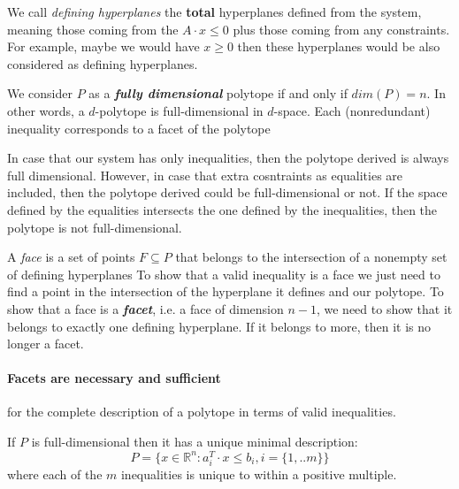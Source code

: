    We call \textit{defining hyperplanes} the \textbf{total}
   hyperplanes defined from the system, meaning 
   those coming from the $A \cdot x \leq 0$ 
   plus those coming from any constraints. 
   For example, maybe we would have $x \geq 0$ then these hyperplanes would be also considered
   as defining hyperplanes.

   We consider $P$ as a \textit{\textbf{fully dimensional}} polytope
   if and only if $dim(P) = n$.
   In other words, 
   a $d$-polytope is full-dimensional in $d$-space.
   Each (nonredundant) inequality corresponds to a facet of the polytope

   In case that our system has only inequalities, 
   then the polytope derived is always full dimensional.
   However, in case that extra cosntraints as equalities
   are included, then the polytope derived could be 
   full-dimensional or not. 
   If the space defined by the equalities intersects the one 
   defined by the inequalities, then the polytope is not full-dimensional.

   
   A \textit{face} is a set of points $ F \subseteq P$ that belongs 
   to the intersection of a nonempty set of defining hyperplanes 
   To show that a valid inequality is a face we just need to 
   find a point in the intersection of the hyperplane it defines
   and our polytope. 
   To show that a face is a \textit{\textbf{facet}}, 
   i.e. a face of dimension $n -1$,
   we need to show that it belongs to exactly one defining hyperplane.
   If it belongs to more, then it is no longer a facet.

   \paragraph{Facets are necessary and sufficient} for the complete description of a polytope 
   in terms of valid inequalities.




      If $P$ is full-dimensional then it has a unique minimal description: 
      \begin{equation}
         P = \{ x \in \mathbb{R}^n : a_{i}^T \cdot x \leq b_{i}, i = \{1, ..m\} \}
      \end{equation}
      where each of the $m$ inequalities is unique to within a positive multiple.
   



